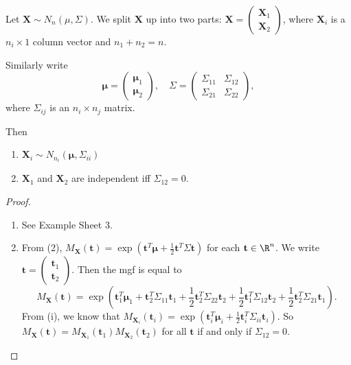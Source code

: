 \documentclass[a4paper]{article}
\begin{document}
\begin{prop}
  Let $\mathbf{X}\sim N_n(\mu, \Sigma)$. We split $\mathbf{X}$ up into two parts: $\mathbf{X} =
  \begin{pmatrix}
    \mathbf{X}_1\\
    \mathbf{X}_2
  \end{pmatrix}$, where $\mathbf{X}_i$ is a $n_i \times 1$ column vector and $n_1 + n_2 = n$.

  Similarly write
  \[
    \boldsymbol\mu =
    \begin{pmatrix}
      \boldsymbol\mu_1\\
      \boldsymbol\mu_2
    \end{pmatrix}
    ,\quad
    \Sigma =
    \begin{pmatrix}
      \Sigma_{11} & \Sigma_{12}\\
      \Sigma_{21} & \Sigma_{22}
    \end{pmatrix},
  \]
  where $\Sigma_{ij}$ is an $n_i\times n_j$ matrix.

  Then
  \begin{enumerate}
    \item $\mathbf{X}_i \sim N_{n_i}(\boldsymbol\mu, \Sigma_{ii})$
    \item $\mathbf{X}_1$ and $\mathbf{X}_2$ are independent iff $\Sigma_{12} = 0$.
  \end{enumerate}
\end{prop}

\begin{proof}\leavevmode
  \begin{enumerate}
    \item See Example Sheet 3.
    \item From (2), $M_\mathbf{X}(\mathbf{t}) = \exp(\mathbf{t}^T \boldsymbol\mu + \frac{1}{2}\mathbf{t}^T\Sigma\mathbf{t})$ for each $\mathbf{t}\in \R^n$. We write $\mathbf{t} = \begin{pmatrix}\mathbf{t}_1\\\mathbf{t}_2\end{pmatrix}$. Then the mgf is equal to
      \[
        M_\mathbf{X}(\mathbf{t}) = \exp\left(\mathbf{t}_1^T\boldsymbol\mu_1 + \mathbf{t}_2^T \Sigma_{11}\mathbf{t}_1 + \frac{1}{2}\mathbf{t}_2^T \Sigma_{22}\mathbf{t}_2 + \frac{1}{2}\mathbf{t}_1^T \Sigma_{12}\mathbf{t}_2 + \frac{1}{2}\mathbf{t}_2^T \Sigma_{21}\mathbf{t}_1\right).
      \]
      From (i), we know that $M_{\mathbf{X}_i}(\mathbf{t}_i) = \exp(\mathbf{t}_i^T\boldsymbol\mu_i + \frac{1}{2}\mathbf{t}_i^T \Sigma_{ii}\mathbf{t}_i)$. So $M_\mathbf{X}(\mathbf{t}) = M_{\mathbf{X}_1}(\mathbf{t}_1)M_{\mathbf{X}_2}(\mathbf{t}_2)$ for all $\mathbf{t}$ if and only if $\Sigma_{12} = 0$.
  \end{enumerate}
\end{proof}
\end{document}
